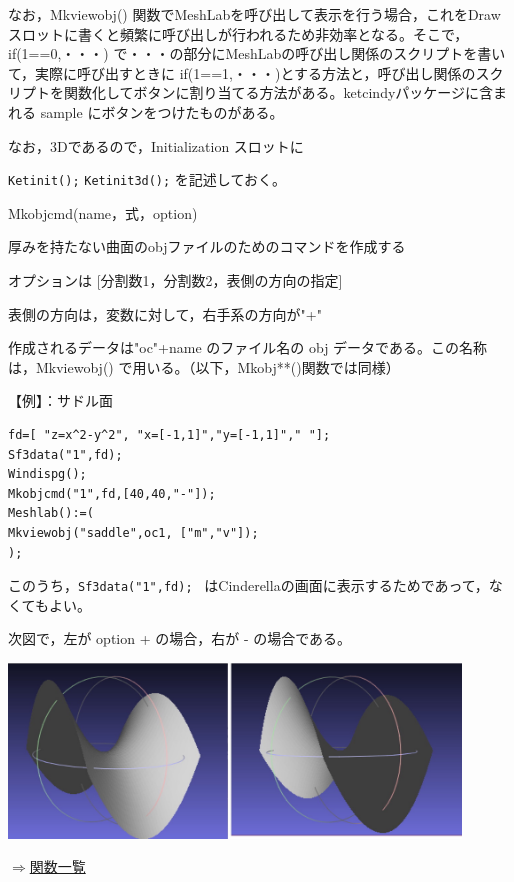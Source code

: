 \documentclass[papersize,a4paper,12pt,uplatex]{jsarticle}
\begin{document}
なお，Mkviewobj() 関数でMeshLabを呼び出して表示を行う場合，これをDrawスロットに書くと頻繁に呼び出しが行われるため非効率となる。そこで，if(1==0,・・・) で・・・の部分にMeshLabの呼び出し関係のスクリプトを書いて，実際に呼び出すときに if(1==1,・・・)とする方法と，呼び出し関係のスクリプトを関数化してボタンに割り当てる方法がある。ketcindyパッケージに含まれる sample にボタンをつけたものがある。

なお，3Dであるので，Initialization スロットに

\verb|Ketinit();|
\verb|Ketinit3d();|
を記述しておく。

\begin{description}

\hypertarget{mkobjcmd}{}
\item[関数]Mkobjcmd(name，式，option)
\item[機能]厚みを持たない曲面のobjファイルのためのコマンドを作成する
\item[説明]オプションは [分割数1，分割数2，表側の方向の指定]

表側の方向は，変数に対して，右手系の方向が"+"

作成されるデータは"oc"+name のファイル名の obj データである。この名称は，Mkviewobj() で用いる。（以下，Mkobj**()関数では同様）

\vspace{\baselineskip}
【例】：サドル面
\begin{verbatim}
fd=[ "z=x^2-y^2", "x=[-1,1]","y=[-1,1]"," "];
Sf3data("1",fd);
Windispg();
Mkobjcmd("1",fd,[40,40,"-"]); 
Meshlab():=(
Mkviewobj("saddle",oc1, ["m","v"]); 
);
\end{verbatim}
このうち，\verb|Sf3data("1",fd); | はCinderellaの画面に表示するためであって，なくてもよい。

次図で，左が option + の場合，右が - の場合である。

\includegraphics[bb=0 0 679.53 263.51 , width=12cm]{Fig/meshlab01.pdf}
\vspace{\baselineskip}
\begin{flushright}\hyperlink{functionlist}{$\Rightarrow$関数一覧}\end{flushright}


\end{description}
\end{document}
